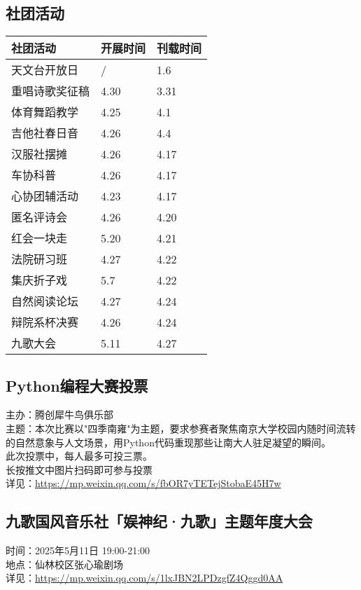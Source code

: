 \documentclass[letterpaper, 12pt]{article}
\begin{document}
\begin{multicols}{2}
\section{社团活动}
\begin{tabular}{|>{\centering\arraybackslash}m{}|m{}|m{}|}
    \hline
    社团活动 & 开展时间 & 刊载时间\\
    \hline\hline
    天文台开放日 & / & 1.6\\
    重唱诗歌奖征稿 & 4.30 & 3.31\\
    体育舞蹈教学 & 4.25 & 4.1\\
    吉他社春日音 & 4.26 & 4.4\\
    汉服社摆摊 & 4.26 & 4.17\\
    车协科普 & 4.26 & 4.17\\
    心协团辅活动 & 4.23 & 4.17\\
    匿名评诗会 & 4.26 & 4.20\\
    红会一块走 & 5.20 & 4.21\\
    法院研习班 & 4.27 & 4.22\\
    集庆折子戏 & 5.7 & 4.22\\
    自然阅读论坛 & 4.27 & 4.24\\
    辩院系杯决赛 & 4.26 & 4.24\\
    九歌大会 & 5.11 & 4.27\\
    \hline
\end{tabular}
\subsection{Python编程大赛投票} %
主办：腾创犀牛鸟俱乐部
\\主题：本次比赛以"四季南雍"为主题，要求参赛者聚焦南京大学校园内随时间流转的自然意象与人文场景，用Python代码重现那些让南大人驻足凝望的瞬间。
\\此次投票中，每人最多可投三票。
\\长按推文中图片扫码即可参与投票
\\详见：\url{https://mp.weixin.qq.com/s/fbOR7yTETejStobaE45H7w}

\subsection{九歌国风音乐社「娱神纪·九歌」主题年度大会} %
时间：2025年5月11日 19:00-21:00
\\地点：仙林校区张心瑜剧场
\\详见：\url{https://mp.weixin.qq.com/s/1lxJBN2LPDzgfZ4Qggd0AA}
\end{multicols}
\end{document}
